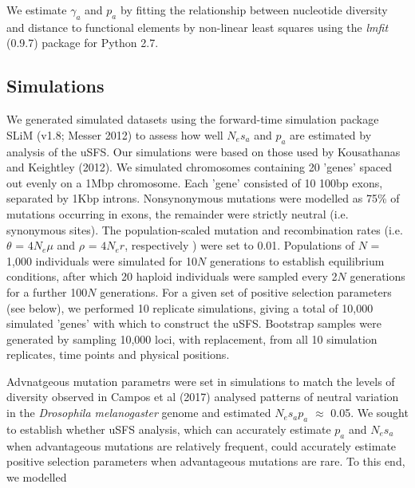\documentclass[11pt]{article}
\begin{document}
	
	We estimate $\gamma_a$ and $p_a$ by fitting the relationship between nucleotide diversity and distance to functional elements by non-linear least squares using the \emph{lmfit} (0.9.7) package for Python 2.7.
 
	\subsection*{Simulations}
	
	We generated simulated datasets using the forward-time simulation package SLiM (v1.8; Messer 2012) to assess how well $N_es_a$ and $p_a$ are estimated by analysis of the uSFS. Our simulations were based on those used by Kousathanas and Keightley (2012). We simulated chromosomes containing 20 'genes' spaced out evenly on a 1Mbp chromosome. Each 'gene' consisted of 10 100bp exons, separated by 1Kbp introns.  Nonsynonymous mutations were modelled as 75\% of mutations occurring in exons,  the remainder were strictly neutral (i.e. synonymous sites). The population-scaled mutation and recombination rates (i.e. $\theta$ = \emph{$4N_{e}\mu$} and $\rho$ = \emph{$4N_{e}r$}, respectively ) were set to 0.01. Populations of $N$ = 1,000 individuals were simulated for 10$N$ generations to establish equilibrium conditions, after which 20 haploid individuals were sampled every 2$N$ generations for a further 100$N$ generations. For a given set of positive selection parameters (see below), we performed 10 replicate simulations, giving a total of 10,000 simulated 'genes' with which to construct the uSFS. Bootstrap samples were generated by sampling 10,000 loci, with replacement, from all 10 simulation replicates, time points and physical positions.
	
	Advnatgeous mutation parametrs were set in simulations to match the levels of diversity observed in 
	Campos et al (2017) analysed patterns of neutral variation in the \textit{Drosophila melanogaster} genome and estimated $N_es_ap_a$ $\approx$ 0.05. We sought to establish whether uSFS analysis, which can accurately estimate $p_a$ and $N_es_a$ when advantageous mutations are relatively frequent, could accurately estimate positive selection parameters when advantageous mutations are rare. To this end, we modelled 
\end{document}
